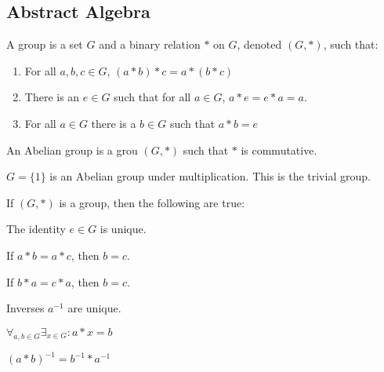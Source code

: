 \documentclass[crop=false,class=book,oneside]{standalone}
\begin{document}
        \subsection{Abstract Algebra}
            \begin{definition}
                A group is a set $G$ and a binary relation $*$
                on $G$, denoted $(G,*)$, such that:
                \begin{enumerate}
                    \item For all ${a,b,c}\in{G}$, $(a*b)*c=a*(b*c)$
                    \item There is an ${e}\in{G}$ such that for all
                        ${a}\in{G}$, $a*e=e*a=a$.
                    \item For all ${a}\in{G}$ there is a ${b}\in{G}$
                        such that $a*b=e$
                \end{enumerate}
            \end{definition}
            \begin{definition}
                An Abelian group is a grou $(G,*)$ such that
                $*$ is commutative.
            \end{definition}
            \begin{example}
                $G=\{1\}$ is an Abelian group
                under multiplication.
                This is the trivial group.
            \end{example}
            \begin{theorem*}
                If $(G,*)$ is a group, then the following are true:
                \begin{enumerate}
                    \begin{multicols}{2}
                        \item The identity ${e}\in{G}$ is unique.
                        \item If $a*b=a*c$, then $b=c$.
                        \item If $b*a=c*a$, then $b=c$.
                        \item Inverses $a^{-1}$ are unique.
                        \item $\forall_{{a,b}\in{G}}%
                            \exists_{{x}\in{G}}:a*x=b$
                        \item $(a*b)^{-1}=b^{-1}*a^{-1}$
                    \end{multicols}
                \end{enumerate}
            \end{theorem*}
\end{document}
